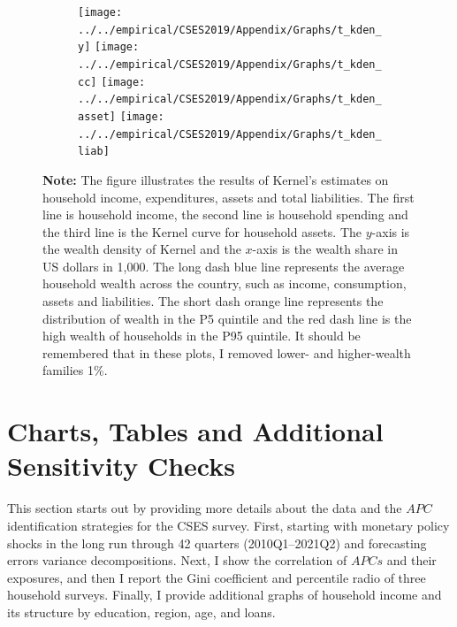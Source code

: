 \documentclass[11pt,letterpaper]{article}
\begin{document}
\begin{figure}[H]
\begin{subfigure}[b]{0.33\linewidth}
		\label{fig:3c}
		\texttt{[image: ../../empirical/CSES2019/Appendix/Graphs/t\_kden\_y]} 	\vspace{-2.5em}
		\newline {}
		\texttt{[image: ../../empirical/CSES2019/Appendix/Graphs/t\_kden\_cc]} 
		\vspace{-2.5em}
		\newline {}
		\texttt{[image: ../../empirical/CSES2019/Appendix/Graphs/t\_kden\_asset]} 
		\vspace{-2.5em}
		\newline {}
		\texttt{[image: ../../empirical/CSES2019/Appendix/Graphs/t\_kden\_liab]} 
		\vspace{-2.5em}
		\newline {}
	\end{subfigure}
	
	\begin{tablenotes}
		\footnotesize
		\item \textbf{Note:} The figure illustrates the results of Kernel’s estimates on household income, expenditures, assets and total liabilities. The first line is household income, the second line is household spending and the third line is the Kernel curve for household assets. The $y$-axis is the wealth density of Kernel and the $x$-axis is the wealth share in US dollars in 1,000. The long dash blue line represents the average household wealth across the country, such as income, consumption, assets and liabilities. The short dash orange line represents the distribution of wealth in the P5 quintile and the red dash line is the high wealth of households in the P95 quintile. It should be remembered that in these plots, I removed lower- and higher-wealth families 1\%.   
	\end{tablenotes} 
	
\end{figure}

\clearpage
\section{Charts, Tables and Additional Sensitivity Checks}\label{data}
This section starts out by providing more details about the data and the $APC$ identification strategies for the CSES survey. First, starting with monetary policy shocks in the long run through 42 quarters (2010Q1--2021Q2) and forecasting errors variance decompositions. Next, I show the correlation of $APCs$ and their exposures, and then I report the Gini coefficient and percentile radio of three household surveys. Finally, I provide additional graphs of household income and its structure by education, region, age, and loans.  
\end{document}
